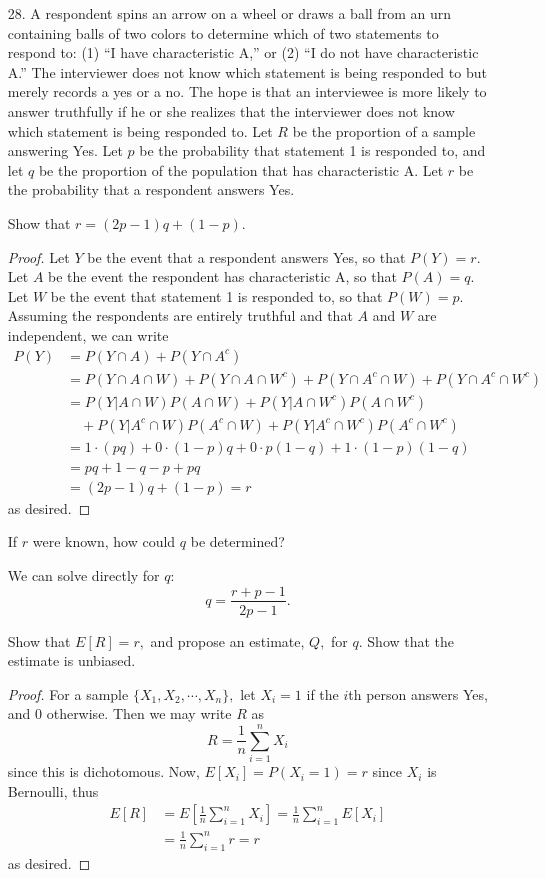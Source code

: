 \documentclass{article}
\begin{document}
\begin{itemize}
	\newpage

	\item[28.] A respondent spins an arrow on a wheel or draws a ball from an urn containing balls of two colors to determine which of two statements to respond to: (1) ``I have characteristic A,'' or (2) ``I do not have characteristic A.'' The interviewer does not know which statement is being responded to but merely records a yes or a no. The hope is that an interviewee is more likely to answer truthfully if he or she realizes that the interviewer does not know which statement is being responded to. Let $R$ be the proportion of a sample answering Yes. Let $p$ be the probability that statement 1 is responded to, and let $q$ be the proportion of the population that has characteristic A. Let $r$ be the probability that a respondent answers Yes.
		\begin{enumerate}[a.]
			\ii Show that $r=(2p-1)q+(1-p).$ 
			\begin{proof}
				Let $Y$ be the event that a respondent answers Yes, so that $P(Y)=r.$ Let $A$ be the event the respondent has characteristic A, so that $P(A)=q.$ Let $W$ be the event that statement 1 is responded to, so that $P(W)=p.$ Assuming the respondents are entirely truthful and that $A$ and $W$ are independent, we can write
				\begin{align*}
					P(Y) &= P(Y \cap A) + P(Y\cap A^c) \\
					&= P(Y\cap A\cap W) + P(Y\cap A\cap W^c) + P(Y\cap A^c\cap W) + P(Y\cap A^c\cap W^c) \\
					&= P(Y\vert A\cap W)P(A\cap W) + P(Y\vert A\cap W^c)P(A\cap W^c)  \\ &\quad + P(Y\vert A^c\cap W)P(A^c\cap W) + P(Y\vert A^c\cap W^c) P(A^c\cap W^c) \\
					&= 1\cdot(pq) + 0\cdot (1-p)q + 0\cdot p(1-q) + 1\cdot (1-p)(1-q) \\
					&= pq + 1 - q - p + pq \\
					&= (2p-1)q + (1-p) = r
				\end{align*} as desired.

			\end{proof}

			\ii If $r$ were known, how could $q$ be determined?
			\begin{soln}
				We can solve directly for $q:$ \[q = \boxed{\frac{r+p-1}{2p-1}.}\]
				
			\end{soln}

			\ii Show that $E[R]=r,$ and propose an estimate, $Q,$ for $q.$ Show that the estimate is unbiased.
			\begin{proof}
				For a sample $\{X_1, X_2, \cdots, X_n\},$ let $X_i=1$ if the $i$th person answers Yes, and 0 otherwise. Then we may write $R$ as \[R=\frac{1}{n}\sum_{i=1}^n X_i\] since this is dichotomous. Now, $E[X_i]=P(X_i=1)=r$ since $X_i$ is Bernoulli, thus
				\begin{align*}
					E[R] &= E\left[ \frac{1}{n}\sum_{i=1}^n X_i \right] = \frac{1}{n}\sum_{i=1}^n E[X_i] \\
					&= \frac{1}{n} \sum_{i=1}^n r = r
				\end{align*} as desired.


\end{proof}
\end{enumerate}
\end{itemize}
\end{document}
